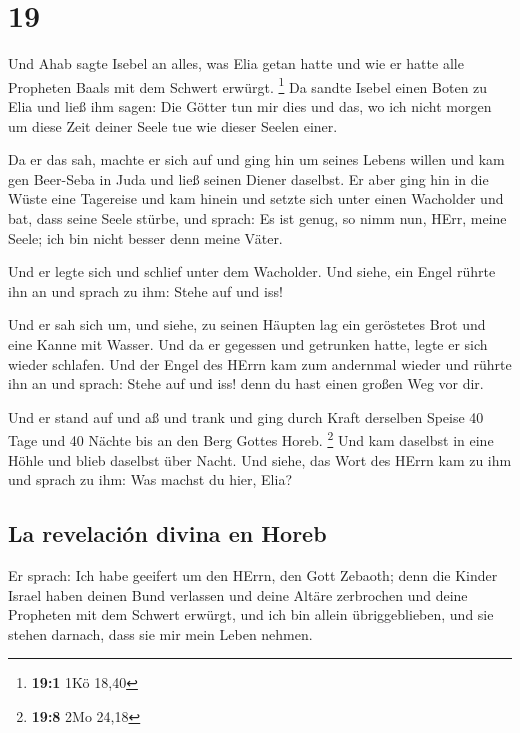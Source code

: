 \hypertarget{section-18}{%
\section{19}\label{section-18}}

 Und Ahab sagte Isebel an alles, was Elia getan hatte und
wie er hatte alle Propheten Baals mit dem Schwert erwürgt. \footnote{\textbf{19:1}
  1Kö 18,40}  Da sandte Isebel einen Boten zu Elia und
ließ ihm sagen: Die Götter tun mir dies und das, wo ich nicht morgen um
diese Zeit deiner Seele tue wie dieser Seelen einer.

 Da er das sah, machte er sich auf und ging hin um seines
Lebens willen und kam gen Beer-Seba in Juda und ließ seinen Diener
daselbst.  Er aber ging hin in die Wüste eine Tagereise
und kam hinein und setzte sich unter einen Wacholder und bat, dass seine
Seele stürbe, und sprach: Es ist genug, so nimm nun, HErr, meine Seele;
ich bin nicht besser denn meine Väter.

 Und er legte sich und schlief unter dem Wacholder. Und
siehe, ein Engel rührte ihn an und sprach zu ihm: Stehe auf und iss!

 Und er sah sich um, und siehe, zu seinen Häupten lag ein
geröstetes Brot und eine Kanne mit Wasser. Und da er gegessen und
getrunken hatte, legte er sich wieder schlafen.  Und der
Engel des HErrn kam zum andernmal wieder und rührte ihn an und sprach:
Stehe auf und iss! denn du hast einen großen Weg vor dir.

 Und er stand auf und aß und trank und ging durch Kraft
derselben Speise 40 Tage und 40 Nächte bis an den Berg Gottes Horeb.
\footnote{\textbf{19:8} 2Mo 24,18}  Und kam daselbst in
eine Höhle und blieb daselbst über Nacht. Und siehe, das Wort des HErrn
kam zu ihm und sprach zu ihm: Was machst du hier, Elia?

\hypertarget{la-revelaciuxf3n-divina-en-horeb}{%
\subsection{La revelación divina en
Horeb}\label{la-revelaciuxf3n-divina-en-horeb}}

 Er sprach: Ich habe geeifert um den HErrn, den Gott
Zebaoth; denn die Kinder Israel haben deinen Bund verlassen und deine
Altäre zerbrochen und deine Propheten mit dem Schwert erwürgt, und ich
bin allein übriggeblieben, und sie stehen darnach, dass sie mir mein
Leben nehmen.

